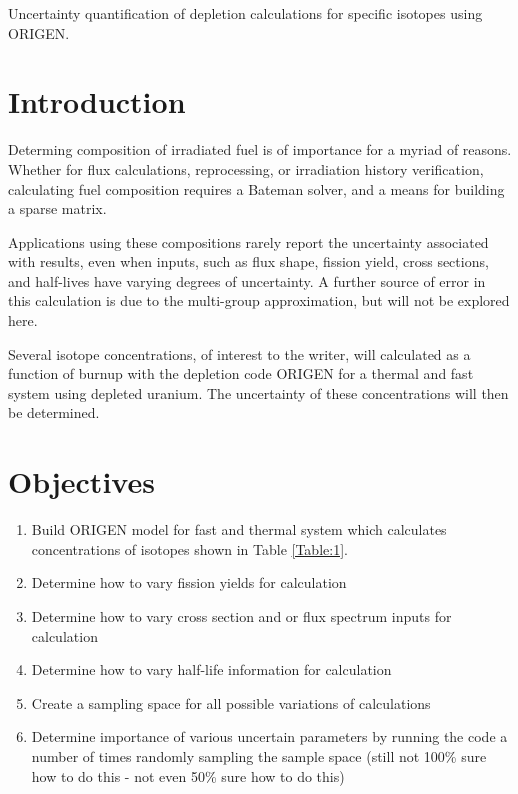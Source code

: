 \documentclass[11pt,notitlepage]{article}
\newcommand\tab[1][0.6cm]{\hspace*{#1}}
\begin{document}
\vspace*{0.5cm}


\vspace{1cm}
Uncertainty quantification of depletion calculations
for specific isotopes using ORIGEN.

 
\section{Introduction}

\tab
Determing composition of irradiated fuel is of importance
for a myriad of reasons. Whether for flux calculations,
reprocessing, or irradiation history verification,
calculating fuel composition requires a Bateman solver,
and a means for building a sparse matrix.

Applications using these compositions rarely report the
uncertainty associated with results, even when inputs,
such as flux shape, fission yield, cross sections,
and half-lives have varying degrees of uncertainty. A further
source of error in this calculation is due to the multi-group
approximation, but will not be explored here.

Several isotope concentrations, of interest to the writer,
will calculated as a function of burnup
with the depletion code ORIGEN for a thermal
and fast system using depleted uranium.
The uncertainty of these concentrations
will then be determined.


\section{Objectives}

\begin{enumerate}
\item{Build ORIGEN model for fast and thermal system which
  calculates concentrations of isotopes shown in
  Table \ref{Table:1}.}
\item{Determine how to vary fission yields for calculation}
\item{Determine how to vary cross section and or flux spectrum
  inputs for calculation}
\item{Determine how to vary half-life information for calculation}
\item{Create a sampling space for all possible variations of
  calculations}
\item{Determine importance of various uncertain parameters
  by running the code a number of times randomly sampling
  the sample space (still not 100\% sure how to do this -
  not even 50\% sure how to do this)}
\end{enumerate}
\end{document}
